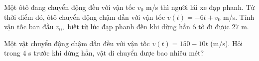 \begin{vd}%
	Một ôtô đang chuyển động đều với vận tốc $v_0$ m/s thì người lái xe đạp phanh. Từ thời điểm đó, ôtô  chuyển động chậm dần với vận tốc $v(t)=-6t+v_0$ m/s. Tính vận tốc ban đầu $v_0,$ biết từ lúc đạp phanh đến khi dừng hẳn ô tô đi được $27$ m.  
\end{vd}
\begin{vd}%
	Một vật chuyển động chậm dần đều với vận tốc $v(t)=150-10t$ (m/s). Hỏi trong $4$ s trước khi dừng hẳn, vật di chuyển được bao nhiêu mét?
\end{vd}
